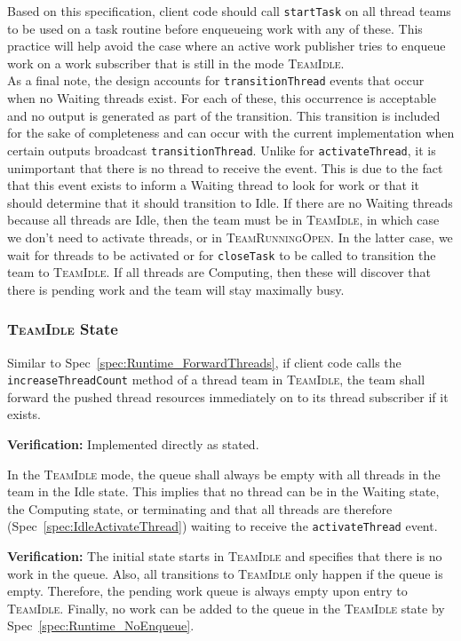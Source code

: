 \documentclass{article}
\newcommand{\TeamIdle}          {\textsc{TeamIdle}}
\newcommand{\TeamRunningOpen}   {\textsc{TeamRunningOpen}}
\newcommand{\taskroutine}        {task routine\xspace}
\begin{document}
Based on this specification, client code should call \texttt{startTask} on all
thread teams to be used on a \taskroutine before enqueueing work with any of these.  This
practice will help avoid the case where an active work publisher tries to
enqueue work on a work subscriber that is still in the mode \TeamIdle.\\

As a final note, the design accounts for \texttt{transitionThread} events that
occur when no Waiting threads exist.  For each of these, this occurrence is
acceptable and no output is generated as part of the transition.  This
transition is included for the sake of completeness and can occur with the
current implementation when certain outputs broadcast \texttt{transitionThread}.
Unlike for \texttt{activateThread}, it is unimportant that there is no thread to
receive the event.  This is due to the fact that this event exists to inform a
Waiting thread to look for work or that it should determine that it should
transition to Idle.  If there are no Waiting threads because all threads are
Idle, then the team must be in \TeamIdle, in which case we don't need to
activate threads, or in \TeamRunningOpen.  In the latter case, we wait for
threads to be activated or for \texttt{closeTask} to be called to transition
the team to \TeamIdle.  If all threads are Computing, then these will discover
that there is pending work and the team will stay maximally busy.

\subsubsection{{\TeamIdle} State}
\begin{spec}
Similar to Spec~\ref{spec:Runtime_ForwardThreads}, if client code calls the
\texttt{increaseThreadCount} method of a thread team in \TeamIdle, the team shall
forward the pushed thread resources immediately on to its thread subscriber if
it exists.
\end{spec}
\textbf{Verification:}\hspace{0.125in}  Implemented directly as stated.

\begin{spec}
In the {\TeamIdle} mode, the queue shall always be empty with all threads in the
team in the Idle state.  This implies that no thread can be in the Waiting
state, the Computing state, or terminating and that all threads are therefore
(Spec~\ref{spec:IdleActivateThread}) waiting to receive the
\texttt{activateThread} event.
\end{spec}
\textbf{Verification:}\hspace{0.125in}  The initial state starts in {\TeamIdle}
and specifies that there is no work in the queue.  Also, all transitions to
{\TeamIdle} only happen if the queue is empty.  Therefore, the pending work
queue is always empty upon entry to \TeamIdle.  Finally, no work can be added to
the queue in the {\TeamIdle} state by Spec~\ref{spec:Runtime_NoEnqueue}.\\
\end{document}
